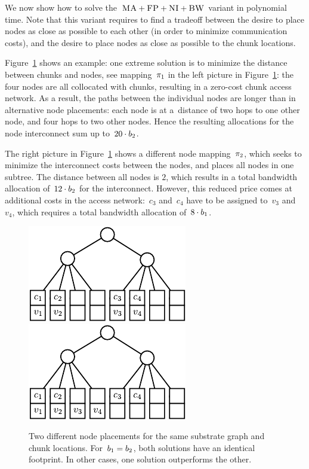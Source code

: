 We now show how to solve the~$\textsc{MA}+\textsc{FP}+\textsc{NI}+\textsc{BW}$ variant
in polynomial time.
Note that this variant requires to find a
tradeoff between the desire to place nodes as close as possible to each other
(in order to minimize communication costs), and the desire to place nodes
as close as possible to
the chunk locations.




 Figure~\ref{fig:dynamic_motivation} shows an example: one
extreme solution is to minimize the distance between chunks and nodes,
see mapping~$\pi_1$ in the left picture in
Figure~\ref{fig:dynamic_motivation}: the four nodes are all
collocated with chunks, resulting in a zero-cost chunk access network. As a
result, the paths between the individual nodes are longer than in alternative
node placements: each node is at a~distance of two hops to one other node,
and four hops to two other nodes. Hence the resulting allocations for the
node interconnect sum up to~$20 \cdot b_2$.


The right picture in Figure~\ref{fig:dynamic_motivation} shows a different node
mapping~$\pi_2$, which seeks to minimize the interconnect costs
between the nodes, and places all nodes in one subtree. The distance between all
nodes is $2$, which results in a total bandwidth allocation of~$12\cdot b_2$
for the interconnect. However, this reduced price comes at additional costs in
the access network:~$c_3$ and~$c_4$ have to be assigned to~$v_3$ and~$v_4$,
which requires a total bandwidth allocation of~$8 \cdot b_1$.


\begin{figure}
  \centering
\includegraphics[width = 0.39\columnwidth]{figs/static-mapping/dynamic_bad}
\hspace{1cm}
\centering
\includegraphics[width = 0.39\columnwidth]{figs/static-mapping/dynamic_good}
\caption{Two different node placements for the same substrate graph and chunk
locations. For~$b_1 = b_2$, both solutions have an identical
footprint. In other cases, one solution outperforms the other.}
\label{fig:dynamic_motivation}
\vspace{-1em}
\end{figure}




